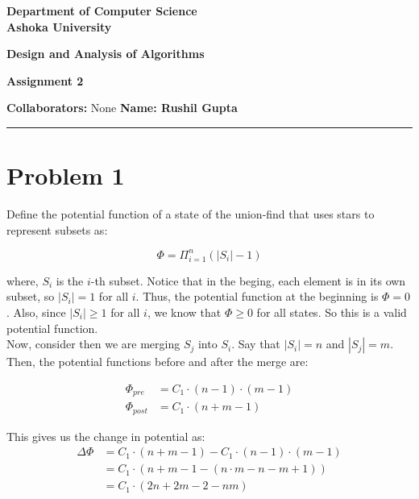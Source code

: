 \documentclass[a4paper]{article}
\begin{document}
\begin{center}
{\large \bf \color{red}  Department of Computer Science} \\
{\large \bf \color{red}  Ashoka University} \\

\vspace{0.1in}

{\large \bf \color{blue} Design and Analysis of Algorithms}

\vspace{0.05in}

    { \bf \color{YellowOrange} Assignment 2}
\end{center}
\medskip

{\textbf{Collaborators:} None} \hfill {\textbf{Name: Rushil Gupta} }

\bigskip
\hrule


\section*{Problem 1}
Define the potential function of a state of the union-find that uses stars to represent subsets as:

\[
\Phi = \Pi_{i=1}^{n} (|S_i| - 1)
\]

\noindent where, $S_i$ is the $i$-th subset. Notice that in the beging, each element is in its own subset, so $|S_i| = 1$ for all $i$. Thus, the potential function at the beginning is $\Phi = 0$. Also, since $|S_i| \geq 1$ for all $i$, we know that $\Phi \geq 0$ for all states. So this is a valid potential function.\\

\noindent Now, consider then we are merging $S_j$ into $S_i$. Say that $|S_i| = n$ and $|S_j| = m$. Then, the potential functions before and after the merge are:

\begin{align*}
    \Phi_{pre} &= C_1 \cdot (n - 1) \cdot (m - 1)\\
    \Phi_{post} &= C_1 \cdot (n + m - 1)
\end{align*}

\noindent This gives us the change in potential as:
\begin{align*}
    \Delta \Phi &= C_1 \cdot (n + m - 1) - C_1 \cdot (n - 1) \cdot (m - 1)\\
    &= C_1 \cdot \left(n + m - 1 -  (n \cdot m - n - m + 1) \right)\\
    &= C_1 \cdot \left(2n + 2m - 2 - nm \right)\\
\end{align*}
\end{document}
